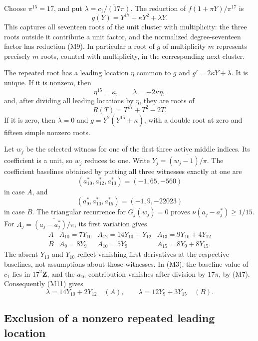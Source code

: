 \documentclass[
  british,
  10pt,
  a4paper,
]{article}
\begin{document}
Choose \(\pi^{15}=17\), and put \(\lambda=\overline{c_1/(17\pi)}\). The
reduction of \(f(1+\pi Y)/\pi^{17}\) is \[
g(Y)=Y^{17}+\kappa Y^2+\lambda Y.                              \tag{M9}
\] This captures all seventeen roots of the unit cluster with
multiplicity: the three roots outside it contribute a unit factor, and
the normalized degree-seventeen factor has reduction (M9). In particular
a root of \(g\) of multiplicity \(m\) represents precisely \(m\) roots,
counted with multiplicity, in the corresponding next cluster.

The repeated root has a leading location \(\eta\) common to \(g\) and
\(g'=2\kappa Y+\lambda\). It is unique. If it is nonzero, then \[
\eta^{15}=\kappa,\qquad \lambda=-2\kappa\eta,
\] and, after dividing all leading locations by \(\eta\), they are roots
of \[
R(T)=T^{17}+T^2-2T.                                          \tag{M10}
\] If it is zero, then \(\lambda=0\) and \(g=Y^2(Y^{15}+\kappa)\), with
a double root at zero and fifteen simple nonzero roots.

Let \(w_j\) be the selected witness for one of the first three active
middle indices. Its coefficient is a unit, so \(w_j\) reduces to one.
Write \(Y_j=\overline{(w_j-1)/\pi}\). The coefficient baselines obtained
by putting all three witnesses exactly at one are \[
(a_{10}^*,a_{12}^*,a_{13}^*)=(-1,65,-560)
\] in case \(A\), and \[
(a_9^*,a_{10}^*,a_{15}^*)=(-1,9,-22023)
\] in case \(B\). The triangular recurrence for \(G_j(w_j)=0\) proves
\(\nu(a_j-a_j^*)\geq1/15\). For \(A_j=\overline{(a_j-a_j^*)/\pi}\), its
first variation gives \[
\begin{array}{c|ccc}
A&A_{10}=7Y_{10}&A_{12}=14Y_{10}+Y_{12}
&A_{13}=9Y_{10}+4Y_{12}\\
B&A_9=8Y_9&A_{10}=5Y_9&A_{15}=8Y_9+8Y_{15}.
\end{array}                                                   \tag{M11}
\] The absent \(Y_{13}\) and \(Y_{10}\) reflect vanishing first
derivatives at the respective baselines, not assumptions about those
witnesses. In (M3), the baseline value of \(c_1\) lies in
\(17^2\mathbf Z\), and the \(a_{16}\) contribution vanishes after
division by \(17\pi\), by (M7). Consequently (M11) gives \[
\lambda=14Y_{10}+2Y_{12}\quad(A),\qquad
\lambda=12Y_9+3Y_{15}\quad(B).                                \tag{M12}
\]

\subsection{Exclusion of a nonzero repeated leading
location}\label{exclusion-of-a-nonzero-repeated-leading-location}
\end{document}
